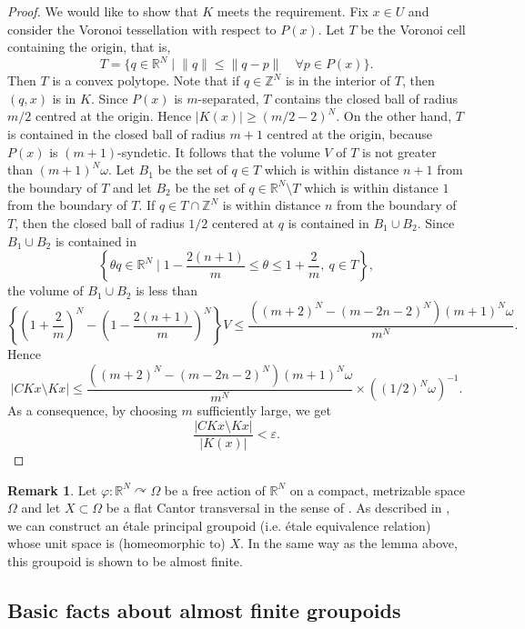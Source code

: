 \documentclass[11pt]{article}
\theoremstyle{definition}
\newtheorem{rem}[thm]{Remark}
\renewcommand{\phi}{\varphi}
\newcommand{\ep}{\varepsilon}
\newcommand{\Z}{\mathbb{Z}}
\newcommand{\R}{\mathbb{R}}
\begin{document}
\begin{proof}
We would like to show that $K$ meets the requirement. 
Fix $x\in U$ and 
consider the Voronoi tessellation with respect to $P(x)$. 
Let $T$ be the Voronoi cell containing the origin, that is, 
\[
T=\{q\in\R^N\mid
\lVert q\rVert\leq\lVert q-p\rVert\quad\forall p\in P(x)\}. 
\]
Then $T$ is a convex polytope. 
Note that if $q\in\Z^N$ is in the interior of $T$, then $(q,x)$ is in $K$. 
Since $P(x)$ is $m$-separated, 
$T$ contains the closed ball of radius $m/2$ centred at the origin. 
Hence $\lvert K(x)\rvert\geq(m/2-2)^N$. 
On the other hand, 
$T$ is contained in the closed ball of radius $m{+}1$ centred at the origin, 
because $P(x)$ is $(m{+}1)$-syndetic. 
It follows that 
the volume $V$ of $T$ is not greater than $(m{+}1)^N\omega$. 
Let $B_1$ be the set of $q\in T$ 
which is within distance $n{+}1$ from the boundary of $T$ and 
let $B_2$ be the set of $q\in\R^N\setminus T$ 
which is within distance $1$ from the boundary of $T$. 
If $q\in T\cap\Z^N$ is within distance $n$ from the boundary of $T$, 
then the closed ball of radius $1/2$ centered at $q$ is 
contained in $B_1\cup B_2$. 
Since $B_1\cup B_2$ is contained in 
\[
\left\{\theta q\in\R^N\mid1-\frac{2(n+1)}{m}\leq\theta\leq1+\frac{2}{m},\
q\in T\right\}, 
\]
the volume of $B_1\cup B_2$ is less than 
\[
\left\{\left(1+\frac{2}{m}\right)^N-\left(1-\frac{2(n+1)}{m}\right)^N\right\}V
\leq\frac{((m+2)^N-(m-2n-2)^N)(m+1)^N\omega}{m^N}. 
\]
Hence 
\[
\lvert CKx\setminus Kx\rvert
\leq\frac{((m+2)^N-(m-2n-2)^N)(m+1)^N\omega}{m^N}\times((1/2)^N\omega)^{-1}. 
\]
As a consequence, by choosing $m$ sufficiently large, 
we get 
\[
\frac{\lvert CKx\setminus Kx\rvert}{\lvert K(x)\rvert}<\ep. 
\]
\end{proof}

\begin{rem}
Let $\phi:\R^N\curvearrowright\Omega$ be a free action of $\R^N$ 
on a compact, metrizable space $\Omega$ and 
let $X\subset\Omega$ be a flat Cantor transversal 
in the sense of \cite[Definition 2.1]{GMPS2}. 
As described in \cite{GMPS2}, 
we can construct an \'etale principal groupoid 
(i.e. \'etale equivalence relation) whose unit space is (homeomorphic to) $X$. 
In the same way as the lemma above, 
this groupoid is shown to be almost finite. 
\end{rem}


\subsection{Basic facts about almost finite groupoids}
\end{document}
